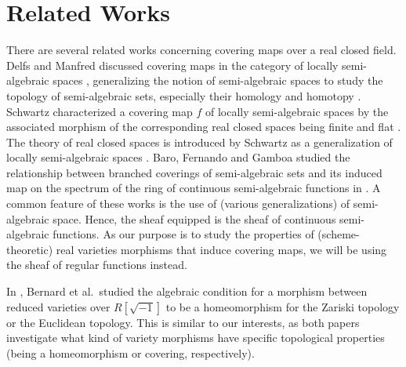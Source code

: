 \section{Related Works}
There are several related works concerning covering maps over a real closed field. Delfs and Manfred discussed covering maps in the category of locally semi-algebraic spaces \cite[Section 5]{delfs1984introduction}, generalizing the notion of semi-algebraic spaces to study the topology of semi-algebraic sets, especially their homology and homotopy \cite{delfs1981semialgebraic,knebusch1981semialgebraic,delfs1985locally,knebusch1989weakly}. Schwartz characterized a covering map $f$ of locally semi-algebraic spaces by the associated morphism of the corresponding real closed spaces being finite and flat \cite{schwartz1988open}. The theory of real closed spaces is introduced by Schwartz as a generalization of locally semi-algebraic spaces \cite{schwartz1989basic}. Baro, Fernando and Gamboa studied the relationship between branched coverings of semi-algebraic sets and its induced map on the spectrum of the ring of continuous semi-algebraic functions in \cite{baro2022spectral}. A common feature of these works is the use of (various generalizations) of semi-algebraic space. Hence, the sheaf equipped is the sheaf of continuous semi-algebraic functions. As our purpose is to study the properties of (scheme-theoretic) real varieties morphisms that induce covering maps, we will be using the sheaf of regular functions instead. %

	In \cite{bernard2024algebraic}, Bernard et al.\ studied the algebraic condition for a morphism between reduced varieties over $R[\sqrt{-1}]$ to be a homeomorphism for the Zariski topology or the Euclidean topology. This is similar to our interests, as both papers investigate what kind of variety morphisms have specific topological properties (being a homeomorphism or covering, respectively).